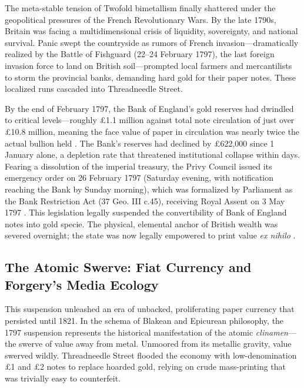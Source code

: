 \documentclass[
]{article}
\begin{document}
The meta-stable tension of Twofold bimetallism finally shattered under
the geopolitical pressures of the French Revolutionary Wars. By the late
1790s, Britain was facing a multidimensional crisis of liquidity,
sovereignty, and national survival. Panic swept the countryside as
rumors of French invasion---dramatically realized by the Battle of
Fishguard (22--24 February 1797), the last foreign invasion force to
land on British soil---prompted local farmers and mercantilists to storm
the provincial banks, demanding hard gold for their paper notes. These
localized runs cascaded into Threadneedle Street.

By the end of February 1797, the Bank of England's gold reserves had
dwindled to critical levels---roughly £1.1 million against total note
circulation of just over £10.8 million, meaning the face value of paper
in circulation was nearly twice the actual bullion held
\citep{clapham1944bank}. The Bank's reserves had declined by £622,000
since 1 January alone, a depletion rate that threatened institutional
collapse within days. Fearing a dissolution of the imperial treasury,
the Privy Council issued its emergency order on 26 February 1797
(Saturday evening, with notification reaching the Bank by Sunday
morning), which was formalized by Parliament as the Bank Restriction Act
(37 Geo. III c.45), receiving Royal Assent on 3 May 1797
\citep{fetter1965development}. This legislation legally suspended the
convertibility of Bank of England notes into gold specie. The physical,
elemental anchor of British wealth was severed overnight; the state was
now legally empowered to print value \emph{ex nihilo}
\citep{ricardo1810high}.

\subsection{The Atomic Swerve: Fiat Currency and Forgery's Media
Ecology}\label{the-atomic-swerve-fiat-currency-and-forgerys-media-ecology}

This suspension unleashed an era of unbacked, proliferating paper
currency that persisted until 1821. In the schema of Blakean and
Epicurean philosophy, the 1797 suspension represents the historical
manifestation of the atomic \emph{clinamen}---the swerve of value away
from metal. Unmoored from its metallic gravity, value swerved wildly.
Threadneedle Street flooded the economy with low-denomination £1 and £2
notes to replace hoarded gold, relying on crude mass-printing that was
trivially easy to counterfeit.
\end{document}
